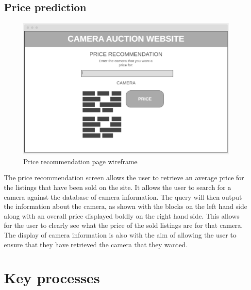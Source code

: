 \subsection{Price prediction}
\begin{figure}[H]
    \centering
    \includegraphics[scale=0.7]{ch2_design/wire_price.png}
    \caption{Price recommendation page wireframe}
    \label{fig:wire_page}
\end{figure}
The price recommendation screen allows the user to retrieve an average price for the listings that have been sold on the site. It allows the user to search for a camera against the database of camera information. The query will then output the information about the camera, as shown with the blocks on the left hand side along with an overall price displayed boldly on the right hand side. This allows for the user to clearly see what the price of the sold listings are for that camera. The display of camera information is also with the aim of allowing the user to ensure that they have retrieved the camera that they wanted.  

\section{Key processes \parencite{microsoft_visio}}
